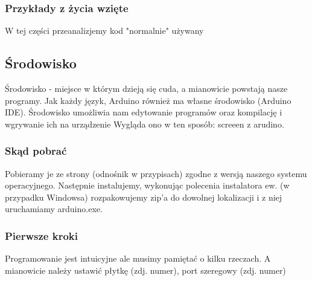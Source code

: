 \subsubsection{Przykłady z życia wzięte}
W tej części przeanalizjemy kod "normalnie" używany
	\subsection{Środowisko}
	Środowisko - miejsce w którym dzieją się cuda, a mianowicie powstają nasze programy. Jak każdy język, Arduino również ma własne środowisko (Arduino IDE).
	Środowisko umożliwia nam edytowanie programów oraz kompilację i wgrywanie ich na urządzenie %
		Wygląda ono w ten sposób: screeen z arudino. 
	\subsubsection{Skąd pobrać}
	Pobieramy je ze strony (odnośnik w przypisach) zgodne z wersją naszego systemu operacyjnego. Następnie instalujemy, wykonując polecenia instalatora
	ew. (w przypadku Windowsa) rozpakowujemy zip'a do dowolnej lokalizacji i z niej uruchamiamy arduino.exe.
\subsubsection{Pierwsze kroki}
Programowanie jest intuicyjne ale musimy pamiętać o kilku rzeczach. A mianowicie należy ustawić płytkę (zdj. numer),  port szeregowy (zdj. numer)%

